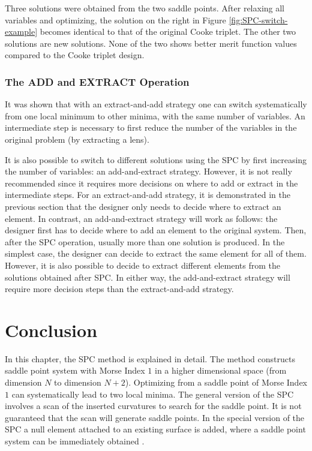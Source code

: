 Three solutions were obtained from the two saddle points. After relaxing all variables and optimizing, the solution on the right in Figure \ref{fig:SPC-switch-example} becomes identical to that of the original Cooke triplet. The other two solutions are new solutions. None of the two shows better merit function values compared to the Cooke triplet design. 


\subsubsection{The ADD and EXTRACT Operation }
It was shown that with an extract-and-add strategy one can switch systematically from one local minimum to other minima, with the same number of variables. An intermediate step is necessary to first reduce the number of the variables in the original problem (by extracting a lens). 

It is also possible to switch to different solutions using the SPC by first increasing the number of variables: an add-and-extract strategy. However, it is not really recommended since it requires more decisions on where to add or extract in the intermediate steps. For an extract-and-add strategy, it is demonstrated in the previous section that the designer only needs to decide where to extract an element. In contrast, an add-and-extract strategy will work as follows: the designer first has to decide where to add an element to the original system. Then, after the SPC operation, usually more than one solution is produced. In the simplest case, the designer can decide to extract the same element for all of them. However, it is also possible to decide to extract different elements from the solutions obtained after SPC. In either way, the add-and-extract strategy will require more decision steps than the extract-and-add strategy.

\section{Conclusion}
In this chapter, the SPC method is explained in detail. The method constructs saddle point system with Morse Index $1$ in a higher dimensional space (from dimension $N$ to dimension $N+2$). Optimizing from a saddle point of Morse Index $1$ can systematically lead to two local minima. The general version of the SPC involves a scan of the inserted curvatures to search for the saddle point. It is not guaranteed that the scan will generate saddle points. In the special version of the SPC a null element attached to an existing surface is added, where a saddle point system can be immediately obtained \cite{BociortSPCSexplained}. 

